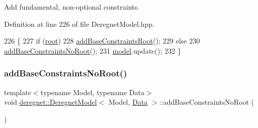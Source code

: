 Add fundamental, non-\/optional constraints. 



Definition at line 226 of file Deregnet\+Model.\+hpp.


\begin{DoxyCode}
226                                                     \{
227     \textcolor{keywordflow}{if} (\hyperlink{classderegnet_1_1DeregnetModel_a54b20393a0e26d65935d387685d7fe96}{root})
228         \hyperlink{classderegnet_1_1DeregnetModel_a65d0e8cac88cc6735659ab41610fd1c9}{addBaseConstraintsRoot}();
229     \textcolor{keywordflow}{else}
230         \hyperlink{classderegnet_1_1DeregnetModel_a808586dd1edcbadefc04de1c378a6cfa}{addBaseConstraintsNoRoot}();
231     \hyperlink{classderegnet_1_1DeregnetModel_a30d525de2086e342b33fe3e45ede4947}{model}.update();
232 \}
\end{DoxyCode}
\mbox{\label{classderegnet_1_1DeregnetModel_a808586dd1edcbadefc04de1c378a6cfa}} 
\subsubsection{\texorpdfstring{add\+Base\+Constraints\+No\+Root()}{addBaseConstraintsNoRoot()}\hspace{0.1cm}{\footnotesize\ttfamily [1/3]}}
{\footnotesize\ttfamily template$<$typename Model, typename Data$>$ \\
void \hyperlink{classderegnet_1_1DeregnetModel}{deregnet\+::\+Deregnet\+Model}$<$ Model, \hyperlink{avgdrgnt_8cpp_a1d1235306db276e9b36acba1db1509e8}{Data} $>$\+::add\+Base\+Constraints\+No\+Root (\begin{DoxyParamCaption}{ }\end{DoxyParamCaption})\hspace{0.3cm}{\ttfamily [private]}}

\mbox{\label{classderegnet_1_1DeregnetModel_ad46d039147e10e7afb08a9ede2fc8a69}} 
